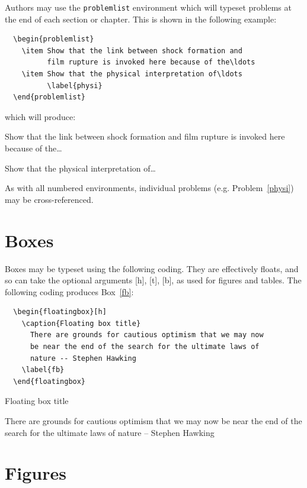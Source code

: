 Authors may use the \verb"problemlist" environment which will typeset problems at the end of each section or chapter. This is shown in the following example:
\begin{verbatim}
  \begin{problemlist}
    \item Show that the link between shock formation and
          film rupture is invoked here because of the\ldots
    \item Show that the physical interpretation of\ldots
          \label{physi}
  \end{problemlist}
\end{verbatim}
which will produce:
  \begin{problemlist}
    \item Show that the link between shock formation and
          film rupture is invoked here because of the\ldots
    \item Show that the physical interpretation of\ldots
          \label{physi}
  \end{problemlist}
As with all numbered environments, individual problems (e.g. Problem~\ref{physi}) may be cross-referenced.


\section{Boxes}

Boxes may be typeset using the following coding. They are effectively floats, and so can take the optional arguments [h], [t], [b], as used for figures and tables. The following coding produces Box~\ref{fb}:
\begin{verbatim}
  \begin{floatingbox}[h]
    \caption{Floating box title}
      There are grounds for cautious optimism that we may now
      be near the end of the search for the ultimate laws of
      nature -- Stephen Hawking
    \label{fb}
  \end{floatingbox}
\end{verbatim}
  \begin{floatingbox}[h]
    \caption{Floating box title}
      There are grounds for cautious optimism that we may now
      be near the end of the search for the ultimate laws of
      nature -- Stephen Hawking
    \label{fb}
  \end{floatingbox}

\section{Figures}

